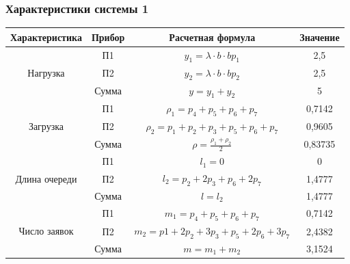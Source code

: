 \subsubsection{Характеристики системы 1}
\begin{tabular}{|c|c|c|c|}
\hline
Характеристика                      & Прибор & Расчетная формула                                                       & Значение \\ \hline
\multirow{3}{*}{Нагрузка}           & П1     & $y_1 = \lambda\cdot b\cdot b p_1$                                       & 2,5      \\ \cline{2-4}
                                    & П2     & $y_2 = \lambda\cdot b\cdot b p_2$                                       & 2,5      \\ \cline{2-4}
                                    & Сумма  & $y = y_1 + y_2$                                                         & 5        \\ \hline
\multirow{3}{*}{Загрузка}           & П1     & $\rho_1 = p_4 + p_5 + p_6 + p_7$                                        & 0,7142   \\ \cline{2-4}
                                    & П2     & $\rho_2 = p_1 + p_2 + p_3 + p_5 + p_6 + p_7$                            & 0,9605   \\ \cline{2-4}
                                    & Сумма  & $\rho = \frac{\rho_1 + \rho_2}{2}$                                      & 0,83735  \\ \hline
\multirow{3}{*}{Длина очереди}      & П1     & $l_1 = 0$                                                               & 0        \\ \cline{2-4}
                                    & П2     & $l_2 = p_2 + 2p_3 + p_6 + 2p_7$                                         & 1,4777   \\ \cline{2-4}
                                    & Сумма  & $l = l_2$                                                               & 1,4777   \\ \hline
\multirow{3}{*}{Число заявок}       & П1     & $m_1 = p_4 + p_5 + p_6 + p_7$                                           & 0,7142   \\ \cline{2-4}
                                    & П2     & $m_2 = p1 + 2p_2 + 3p_3 + p_5 + 2p_6 + 3p_7$                            & 2,4382   \\ \cline{2-4}
                                    & Сумма  & $m = m_1 + m_2$                                                         & 3,1524   \\ \hline

\end{tabular}
